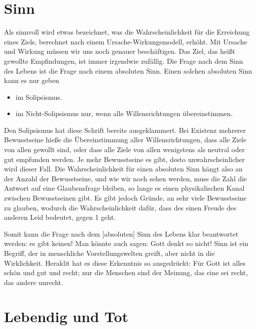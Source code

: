 \documentclass[12pt]{book}
\begin{document}
\section{Sinn}

Als sinnvoll wird etwas bezeichnet, was die Wahrscheinlichkeit für die Erreichung eines Ziels, berechnet nach einem Ursache-Wirkungsmodell, erhöht. Mit Ursache und Wirkung müssen wir uns noch genauer beschäftigen. Das Ziel, das heißt gewollte Empfindungen, ist immer irgendwie zufällig. Die Frage nach dem Sinn des Lebens ist die Frage nach einem absoluten Sinn. Einen solchen absoluten Sinn kann es nur geben
\begin{itemize}
\item im Solipsismus. 
\item im Nicht-Solipsismus nur, wenn alle Willensrichtungen übereinstimmen.
\end{itemize}
Den Solipsismus hat diese Schrift bereits ausgeklammert. Bei Existenz mehrerer Bewusstseine hieße die Übereinstimmung aller Willensrichtungen, dass alle Ziele von allen gewollt sind, oder dass alle Ziele von allen wenigstens als neutral oder gut empfunden werden. Je mehr Bewusstseine es gibt, desto unwahrscheinlicher wird dieser Fall. Die Wahrscheinlichkeit für einen absoluten Sinn hängt also an der Anzahl der Bewusstseine, und wie wir noch sehen werden, muss die Zahl die Antwort auf eine Glaubensfrage bleiben, so lange es einen physikalischen Kanal zwischen Bewusstseinen gibt. Es gibt jedoch Gründe, an sehr viele Bewusstseine zu glauben, wodurch die Wahrscheinlichkeit dafür, dass des einen Freude des anderen Leid bedeutet, gegen 1 geht. 

Somit kann die Frage nach dem [absoluten] Sinn des Lebens klar beantwortet werden: es gibt keinen! Man könnte auch sagen: Gott denkt so nicht! Sinn ist ein Begriff, der in menschliche Vorstellungswelten greift, aber nicht in die Wirklichkeit. Heraklit hat es diese Erkenntnis so ausgedrückt: Für Gott ist alles schön und gut und recht; nur die Menschen sind der Meinung, das eine sei recht, das andere unrecht.

\section{Lebendig und Tot}
\end{document}
